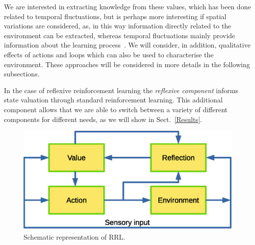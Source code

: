\documentclass{article}
\begin{document}
We are interested in extracting knowledge from these values, which has been done
related to temporal fluctuations, but %
is perhaps more interesting if spatial variations are considered, as, in this way information directly
related to the environment can be extracted, whereas temporal fluctuations mainly provide
information about the learning process~\citep{herrmann1995efficient}. We will consider, in addition, qualitative effects of actions and loops which can also be used to characterise the environment. These approaches will be considered in more details 
in the following subsections.

In the case of reflexive reinforcement learning the \emph{reflexive component} informs state valuation through standard reinforcement learning. This additional component allows that we are able to switch between a variety of different components for different needs, as we will show in Sect.~\ref{Results}.

\begin{figure}[ht] 
\centering
\includegraphics[scale=0.5]{pics/figure1.eps}
	\caption{Schematic representation of RRL.\label{rrlfig}}
\end{figure}
\end{document}
